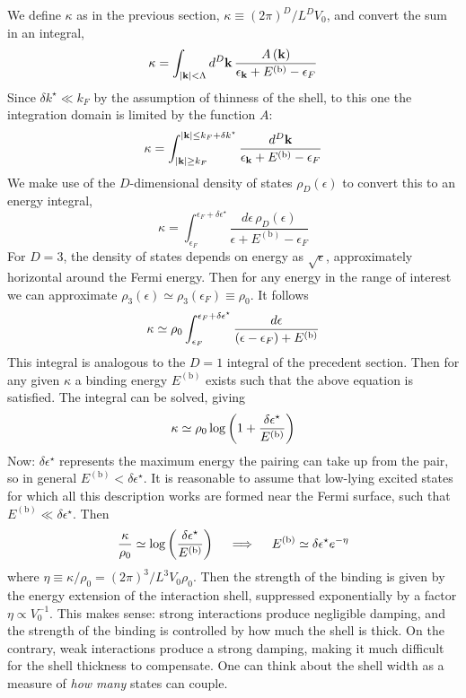 We define $\kappa$ as in the previous section, $\kappa \equiv (2\pi)^D/ L^D V_0$, and convert the sum in an integral,
\[
	\kappa = \int_{\abs{\mathbf{k}}<\Lambda} d^D \mathbf{k} \, \frac{A\left({\mathbf{k}}\right)}{\epsilon_\mathbf{k} + E^{(\mathrm{b})} - \epsilon_F}
\]
Since $\delta k^\star \ll k_F$ by the assumption of thinness of the shell, to this one the integration domain is limited by the function $A$:
\[
	\kappa = \int_{\abs{\mathbf{k}}\ge k_F}^{\abs{\mathbf{k}}\le k_F+\delta k^\star} \frac{d^D \mathbf{k}}{\epsilon_\mathbf{k} + E^{(\mathrm{b})} - \epsilon_F}
\]
We make use of the $D$-dimensional density of states $\rho_D(\epsilon)$ to convert this to an energy integral,
\[
	\kappa = \int_{\epsilon_F}^{\epsilon_F+\delta\epsilon^\star} \frac{d\epsilon \, \rho_D(\epsilon)}{\epsilon + E^{(\mathrm{b})} - \epsilon_F}
\]
For $D=3$, the density of states depends on energy as $\sqrt{\epsilon}$, approximately horizontal around the Fermi energy. Then for any energy in the range of interest we can approximate $\rho_3 (\epsilon) \simeq \rho_3 (\epsilon_F) \equiv \rho_0$. It follows
\[
	\kappa \simeq \rho_0 \int_{\epsilon_F}^{\epsilon_F+\delta\epsilon^\star} \frac{d\epsilon}{\left({\epsilon-\epsilon_F}\right) + E^{(\mathrm{b})}}
\]
This integral is analogous to the $D=1$ integral of the precedent section. Then for any given $\kappa$ a binding energy $E^{(\mathrm{b})}$ exists such that the above equation is satisfied. The integral can be solved, giving
\[
	\kappa \simeq \rho_0 \log \left({1+ \frac{\delta\epsilon^\star}{E^{(\mathrm{b})}}}\right)
\]
Now: $\delta\epsilon^\star$ represents the maximum energy the pairing can take up from the pair, so in general $E^{(\mathrm{b})} < \delta\epsilon^\star$. It is reasonable to assume that low-lying excited states for which all this description works are formed near the Fermi surface, such that $E^{(\mathrm{b})} \ll \delta\epsilon^\star$. Then
\[
	\frac{\kappa}{\rho_0} \simeq \log \left({\frac{\delta\epsilon^\star}{E^{(\mathrm{b})}}}\right)
	\quad\implies\quad
	E^{(\mathrm{b})} \simeq \delta\epsilon^\star e^{-\eta}
\]
where $\eta \equiv \kappa/\rho_0 = (2\pi)^3 / L^3 V_0 \rho_0$. Then the strength of the binding is given by the energy extension of the interaction shell, suppressed exponentially by a factor $\eta \propto V_0^{-1}$. This makes sense: strong interactions produce negligible damping, and the strength of the binding is controlled by how much the shell is thick. On the contrary, weak interactions produce a strong damping, making it much difficult for the shell thickness to compensate. One can think about the shell width as a measure of \textit{how many} states can couple.

